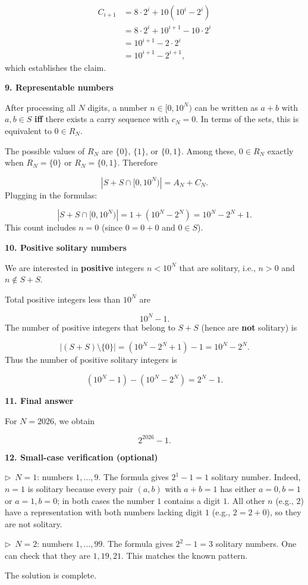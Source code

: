 \documentclass{llmxive}
\providecommand{\solutionheading}[1]{\par\smallskip\noindent\textbf{#1}\par}
\providecommand{\compactbullet}[1]{\par\noindent$\triangleright$~#1\par}
\begin{document}
\[
\begin{aligned}
C_{i+1} &= 8\cdot 2^i + 10(10^i - 2^i) \\
&= 8\cdot 2^i + 10^{i+1} - 10\cdot 2^i \\
&= 10^{i+1} - 2\cdot 2^i \\
&= 10^{i+1} - 2^{i+1},
\end{aligned}
\]
which establishes the claim.\par
\solutionheading{9. Representable numbers}
After processing all \(N\) digits, a number \(n \in [0,10^N)\) can be written as \(a+b\) with \(a,b\in S\) \textbf{iff} there exists a carry sequence with \(c_N = 0\). In terms of the sets, this is equivalent to \(0 \in R_N\).\par
The possible values of \(R_N\) are \(\{0\}\), \(\{1\}\), or \(\{0,1\}\). Among these, \(0 \in R_N\) exactly when \(R_N = \{0\}\) or \(R_N = \{0,1\}\). Therefore\par
\[
|S+S \cap [0,10^N)| = A_N + C_N.
\]
Plugging in the formulas:\par
\[
|S+S \cap [0,10^N)| = 1 + (10^N - 2^N) = 10^N - 2^N + 1.
\]
This count includes \(n = 0\) (since \(0 = 0+0\) and \(0 \in S\)).\par
\solutionheading{10. Positive solitary numbers}
We are interested in \textbf{positive} integers \(n < 10^N\) that are solitary, i.e., \(n > 0\) and \(n \notin S+S\).\par
Total positive integers less than \(10^N\) are\par
\[
10^N - 1.
\]
The number of positive integers that belong to \(S+S\) (hence are \textbf{not} solitary) is\par
\[
|(S+S) \setminus \{0\}| = (10^N - 2^N + 1) - 1 = 10^N - 2^N.
\]
Thus the number of positive solitary integers is\par
\[
(10^N - 1) - (10^N - 2^N) = 2^N - 1.
\]
\solutionheading{11. Final answer}
For \(N = 2026\), we obtain\par
\[
\boxed{2^{2026} - 1}.
\]
\solutionheading{12. Small-case verification (optional)}
\compactbullet{\(N = 1\): numbers \(1,\dots,9\). The formula gives \(2^1 - 1 = 1\) solitary number. Indeed, \(n = 1\) is solitary because every pair \((a,b)\) with \(a+b=1\) has either \(a=0,b=1\) or \(a=1,b=0\); in both cases the number \(1\) contains a digit \(1\). All other \(n\) (e.g., \(2\)) have a representation with both numbers lacking digit \(1\) (e.g., \(2 = 2 + 0\)), so they are not solitary.}
\compactbullet{\(N = 2\): numbers \(1,\dots,99\). The formula gives \(2^2 - 1 = 3\) solitary numbers. One can check that they are \(1, 19, 21\). This matches the known pattern.}
The solution is complete.\par
\par
\end{document}
